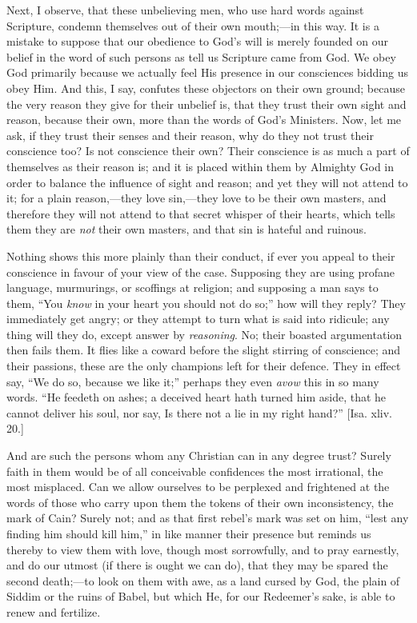 Next, I observe, that these unbelieving men, who use
hard words against Scripture, condemn themselves out of
their own mouth;—in this way. It is a mistake to
suppose that our obedience to God's will is merely
founded on our belief in the word of such persons as tell
us Scripture came from God. We obey God primarily because
we actually feel His presence in our consciences bidding
us obey Him. And this, I say, confutes these objectors on
their own ground; because the very reason they give for
their unbelief is, that they trust their own sight and
reason, because their own, more than the words of God's
Ministers. Now, let me ask, if they trust their senses
and their reason, why do they not trust their conscience
too? Is not conscience their own? Their conscience is as
much a part of themselves as their reason is; and it is
placed within them by Almighty God in order to balance
the influence of sight and reason; and yet they will not
attend to it; for a plain reason,—they love
sin,—they love to be their own masters, and
therefore they will not attend to that secret whisper of
their hearts, which tells them they are \emph{not} their
own masters, and that sin is hateful and ruinous.

Nothing shows this more plainly than their conduct, if
ever you appeal to their conscience in favour of your
view of the case. Supposing they are using profane
language, murmurings, or scoffings at religion; and
supposing a man says to them, ``You \emph{know} in
your heart you should not do so;'' how will they
reply? They immediately get angry; or they attempt to
turn what is said into ridicule; any thing will they do,
except answer by \emph{reasoning}. No; their boasted
argumentation then fails them. It flies like a coward
before the slight stirring of conscience; and their
passions, these are the only champions left for their
defence. They in effect say, ``We do so, because we
like it;'' perhaps they even \emph{avow} this in so
many words. ``He feedeth on ashes; a deceived heart
hath turned him aside, that he cannot deliver his soul,
nor say, Is there not a lie in my right hand?'' [Isa.
xliv. 20.]

And are such the persons whom any Christian can in any
degree trust? Surely faith in them would be of all
conceivable confidences the most irrational, the most
misplaced. Can we allow ourselves to be perplexed and
frightened at the words of those who carry upon them the
tokens of their own inconsistency, the mark of Cain?
Surely not; and as that first rebel's mark was set on
him, ``lest any finding him should kill him,'' in
like manner their presence but reminds us thereby to view
them with love, though most sorrowfully, and to pray
earnestly, and do our utmost (if there is ought we can
do), that they may be spared the second death;—to
look on them with awe, as a land cursed by God, the plain
of Siddim or the ruins of Babel, but which He, for our
Redeemer's sake, is able to renew and fertilize.

